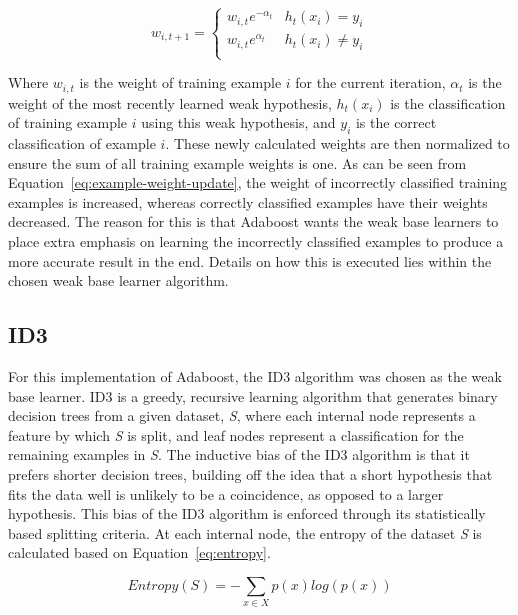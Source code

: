 \documentclass[a4paper]{article}
\begin{document}
\begin{equation}
    \label{eq:example-weight-update}
    w_{i, t+1} =
    \begin{cases} 
      w_{i,t}e^{-\alpha_t} & h_t(x_i) = y_i \\
      w_{i,t}e^{\alpha_t} & h_t(x_i) \ne y_i \\
   \end{cases}
\end{equation}

Where $w_{i,t}$ is the weight of training example $i$ for the current iteration, $\alpha_t$ is the weight of the most recently learned weak hypothesis, $h_t(x_i)$ is the classification of training example $i$ using this weak hypothesis, and $y_i$ is the correct classification of example $i$. These newly calculated weights are then normalized to ensure the sum of all training example weights is one. As can be seen from Equation~\ref{eq:example-weight-update}, the weight of incorrectly classified training examples is increased, whereas correctly classified examples have their weights decreased. The reason for this is that Adaboost wants the weak base learners to place extra emphasis on learning the incorrectly classified examples to produce a more accurate result in the end. Details on how this is executed lies within the chosen weak base learner algorithm. 

\subsection{ID3}
For this implementation of Adaboost, the ID3 algorithm was chosen as the weak base learner. ID3 is a greedy, recursive learning algorithm that generates binary decision trees from a given dataset, \textit{S}, where each internal node represents a feature by which \textit{S} is split, and leaf nodes represent a classification for the remaining examples in \textit{S}. The inductive bias of the ID3 algorithm is that it prefers shorter decision trees, building off the idea that a short hypothesis that fits the data well is unlikely to be a coincidence, as opposed to a larger hypothesis. This bias of the ID3 algorithm is enforced through its statistically based splitting criteria. At each internal node, the entropy of the dataset \textit{S} is calculated based on Equation~\ref{eq:entropy}.

\begin{equation}
    \label{eq:entropy}
    Entropy(S) = -\sum_{x \in X} p(x)log(p(x))
\end{equation}
\end{document}
